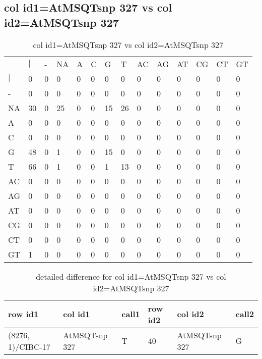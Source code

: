 \subsection{col id1=AtMSQTsnp 327 vs col id2=AtMSQTsnp 327}
\begin{center}
\begin{longtable}{|l|l|l|l|l|l|l|l|l|l|l|l|l|l|}
\caption{col id1=AtMSQTsnp 327 vs col id2=AtMSQTsnp 327} \label{table_dm660}\\
\hline
\\
\hline
&$|$&-&NA&A&C&G&T&AC&AG&AT&CG&CT&GT\\
$|$&0&0&0&0&0&0&0&0&0&0&0&0&0\\
-&0&0&0&0&0&0&0&0&0&0&0&0&0\\
NA&30&0&25&0&0&15&26&0&0&0&0&0&0\\
A&0&0&0&0&0&0&0&0&0&0&0&0&0\\
C&0&0&0&0&0&0&0&0&0&0&0&0&0\\
G&48&0&1&0&0&15&0&0&0&0&0&0&0\\
T&66&0&1&0&0&1&13&0&0&0&0&0&0\\
AC&0&0&0&0&0&0&0&0&0&0&0&0&0\\
AG&0&0&0&0&0&0&0&0&0&0&0&0&0\\
AT&0&0&0&0&0&0&0&0&0&0&0&0&0\\
CG&0&0&0&0&0&0&0&0&0&0&0&0&0\\
CT&0&0&0&0&0&0&0&0&0&0&0&0&0\\
GT&1&0&0&0&0&0&0&0&0&0&0&0&0\\
\hline
\end{longtable}
\end{center}

\begin{center}
\begin{longtable}{|l|l|l|l|l|l|}
\caption{detailed difference for col id1=AtMSQTsnp 327 vs col id2=AtMSQTsnp 327} \label{table_dm661}\\
\hline
row id1&col id1&call1&row id2&col id2&call2\\
\hline
(8276, 1)/CIBC-17&AtMSQTsnp 327&T&40&AtMSQTsnp 327&G\\
\hline
\end{longtable}
\end{center}

